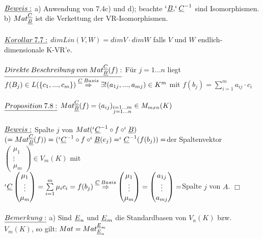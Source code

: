 \documentclass[fleqn, a4paper, 11pt]{scrartcl}
\theoremstyle{definition}
\begin{document}
\\
$\uline{Beweis:}$ a) Anwendung von 7.4c) und d); beachte $^\iota\uline{B},^\iota\uline{C}^{-1}$ sind Isomorphismen.\\
b) $Mat_{\uline{B}}^{\uline{C}}$ ist die Verkettung der VR-Isomorphismen.\\
\\
$\uline{Korollar\:7.7:}$ $dim Lin(V,W)=dim V\cdot dim W$ falls $V$ und $W$ endlich-dimensionale K-VR'e.\\
\\
$\uline{Direkte\:Beschreibung\:von\:Mat_{\uline{B}}^{\uline{C}}(f):}$ Für $j=1...n$ liegt $f(B_j)\in L(\{c_1,...,c_m\})\stackrel{\uline{C}\:Basis}{\Rightarrow}\exists !(a_{1j},...,a_{mj})\in K^m$ mit $f(b_j)=\sum\limits_{i=1}^m a_{ij}\cdot c_i$\\
\\
$\uline{Proposition\:7.8:}$ $Mat_{\uline{B}}^{\uline{C}}(f)=(a_{ij})_{\substack{i=1...m\\j=1...n}}\in M_{mxn}(K)$\\
\\
$\uline{Beweis:}$ Spalte $j$ von $Mat(^\iota\uline{C}^{-1}\circ f\circ ^\iota\uline{B})$ $(=Mat_{\uline{B}}^{\uline{C}}(f))=(^\iota\uline{C}^{-1}\circ f\circ ^\iota\uline{B}(e_j)=^\iota\uline{C}^{-1}(f(b_j))=$der Spaltenvektor $\begin{pmatrix}
	\mu_1\\
	\vdots\\
	\mu_m
\end{pmatrix}\in V_m(K)$ mit $^\iota\uline{C}\begin{pmatrix}
	\mu_1\\
	\vdots\\
	\mu_m
\end{pmatrix}=\sum\limits_{i=1}^m \mu_i c_i=f(b_j)\stackrel{\uline{C}\:Basis}{\Rightarrow}\begin{pmatrix}
	\mu_1\\
	\vdots\\
	\mu_m
\end{pmatrix}=\begin{pmatrix}
	a_{1j}\\
	\vdots\\
	a_{mj}
\end{pmatrix}=$Spalte $j$ von $A$. \hfill $\Box$\\
\\
$\uline{Bemerkung:}$ a) Sind $\uline{E}_n$ und $\uline{E}_m$ die Standardbasen von $V_n(K)$ bzw. $V_m(K)$, so gilt: $Mat=Mat_{\uline{E}_n}^{\uline{E}_m}$\\
\end{document}
